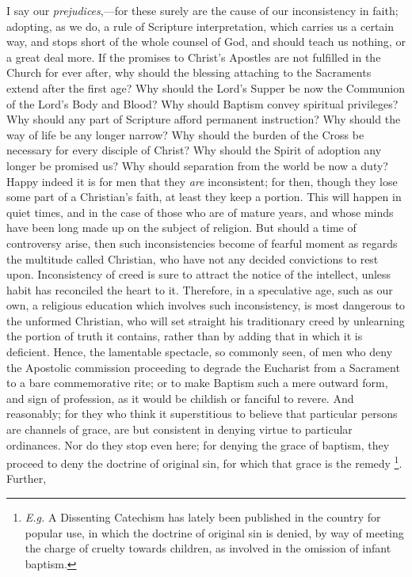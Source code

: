 I say our \emph{prejudices},—for these surely are the cause of our
inconsistency in faith; adopting, as we do, a rule of Scripture
interpretation, which carries us a certain way, and stops short of the
whole counsel of God, and should teach us nothing, or a great deal more.
If the promises to Christ's Apostles are not fulfilled in the Church for
ever after, why should the blessing attaching to the Sacraments extend
after the first age? Why should the Lord's Supper be now the Communion
of the Lord's Body and Blood? Why should Baptism convey spiritual
privileges? Why should any part of Scripture afford permanent
instruction? Why should the way of life be any longer narrow? Why should
the burden of the Cross be necessary for every disciple of Christ? Why
should the Spirit of adoption any longer be promised us? Why should
separation from the world be now a duty? Happy indeed it is for men that
they \emph{are} inconsistent; for then, though they lose some part of a
Christian's faith, at least they keep a portion. This will happen in
quiet times, and in the case of those who are of mature years, and whose
minds have been long made up on the subject of religion. But should a
time of controversy arise, then such inconsistencies become of fearful
moment as regards the multitude called Christian, who have not any
decided convictions to rest upon. Inconsistency of creed is sure to
attract the notice of the intellect, unless habit has reconciled the
heart to it. Therefore, in a speculative age, such as our own, a
religious education which involves such inconsistency, is most dangerous
to the unformed Christian, who will set straight his traditionary creed
by unlearning the portion of truth it contains, rather than by adding
that in which it is deficient. Hence, the lamentable spectacle, so
commonly seen, of men who deny the Apostolic commission proceeding to
degrade the Eucharist from a Sacrament to a bare commemorative rite; or
to make Baptism such a mere outward form, and sign of profession, as it
would be childish or fanciful to revere. And reasonably; for they who
think it superstitious to believe that particular persons are channels
of grace, are but consistent in denying virtue to particular ordinances.
Nor do they stop even here; for denying the grace of baptism, they
proceed to deny the doctrine of original sin, for which that grace is
the remedy \footnote{\emph{E.g.} A Dissenting
Catechism has lately been published in the country for popular use, in
which the doctrine of original sin is denied, by way of meeting the
charge of cruelty towards children, as involved in the omission of
infant baptism.}. Further,
